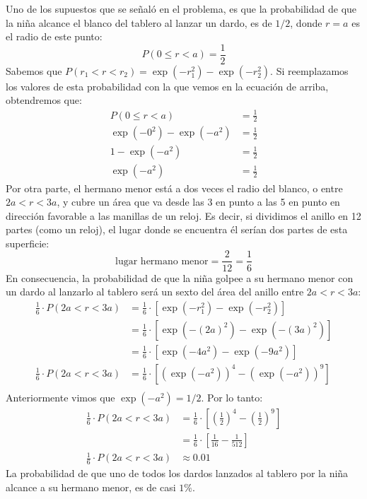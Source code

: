 \documentclass[12pt]{article}
\begin{document}
Uno de los supuestos que se señaló en el problema, es que la probabilidad de que la niña alcance el blanco del tablero al lanzar un dardo, es de $1/2$, donde $r = a$ es el radio de este punto:
\[
  P(0 \leq r < a) = \frac{1}{2}
\]
Sabemos que $P(r_{1} < r < r_{2}) = \exp(-r_{1}^{2}) - \exp(-r_{2}^{2})$. Si reemplazamos los valores de esta probabilidad con la que vemos en la ecuación de arriba, obtendremos que:
\begin{align*}
  P(0 \leq r < a) &= \frac{1}{2} \\
  \exp(-0^{2}) - \exp(-a^{2}) &= \frac{1}{2} \\
  1 - \exp(-a^{2}) &= \frac{1}{2} \\
  \exp(-a^{2}) &= \frac{1}{2}
\end{align*}
Por otra parte, el hermano menor está a dos veces el radio del blanco, o entre $2a < r < 3a$, y cubre un área que va desde las 3 en punto a las 5 en punto en dirección favorable a las manillas de un reloj. Es decir, si dividimos el anillo en 12 partes (como un reloj), el lugar donde se encuentra él serían dos partes de esta superficie:
\[
  \text{lugar hermano menor} = \frac{2}{12} = \frac{1}{6}
\]
En consecuencia, la probabilidad de que la niña golpee a su hermano menor con un dardo al lanzarlo al tablero será un sexto del área del anillo entre $2a < r < 3a$:
\begin{align*}
  \frac{1}{6} \cdot P(2a < r < 3a) &= \frac{1}{6} \cdot [\exp(-r_{1}^{2}) - \exp(-r_{2}^{2})] \\
                                   &= \frac{1}{6} \cdot [\exp(-(2a)^{2}) - \exp(-(3a)^{2})] \\
                                   &= \frac{1}{6} \cdot [\exp(-4a^{2}) - \exp(-9a^{2})] \\
  \frac{1}{6} \cdot P(2a < r < 3a) &= \frac{1}{6} \cdot [(\exp(-a^{2}))^{4} - (\exp(-a^{2}))^{9}] \\
\end{align*}
Anteriormente vimos que $\exp(-a^{2}) = 1/2$. Por lo tanto:
\begin{align*}
  \frac{1}{6} \cdot P(2a < r < 3a) &= \frac{1}{6} \cdot \left[\left(\frac{1}{2}\right)^{4} - \left(\frac{1}{2}\right)^{9}\right] \\
                                   &= \frac{1}{6} \cdot \left[\frac{1}{16} - \frac{1}{512}\right] \\
  \frac{1}{6} \cdot P(2a < r < 3a) &\approx 0.01
\end{align*}
La probabilidad de que uno de todos los dardos lanzados al tablero por la niña alcance a su hermano menor, es de casi $1\%$.
\end{document}

